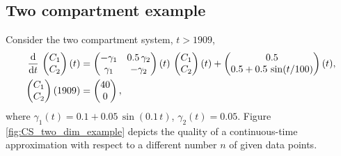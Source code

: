 \documentclass[11pt,a4paper]{article}
\newcommand{\deriv}[1]{\frac{\mathrm{d}}{\mathrm{d}#1}}
\begin{document}
\subsection{Two compartment example}
    Consider the two compartment system, $t>1909$,
    \begin{equation}\label{eqn:CS_two_dim_example}
        \begingroup\makeatletter\def\f@size{10}\check@mathfonts
        \begin{aligned}
            \deriv{t}\,\begin{pmatrix} C_1 \\ C_2 \end{pmatrix}(t) &= 
            \begin{pmatrix} -\gamma_1 & 0.5\,\gamma_2 \\ \gamma_1 & -\gamma_2 \end{pmatrix}(t)\,
            \begin{pmatrix} C_1 \\ C_2 \end{pmatrix}(t) + 
            \begin{pmatrix} 0.5 \\ 0.5 + 0.5\,\sin(t/100) \end{pmatrix}(t),\\
            \begin{pmatrix} C_1 \\ C_2 \end{pmatrix}(1909) &=
            \begin{pmatrix} 40 \\ 0 \end{pmatrix},
        \end{aligned}
        \endgroup
    \end{equation}
    where $\gamma_1(t)=0.1+0.05\,\sin(0.1\,t)$, $\gamma_2(t)=0.05$.
    Figure \ref{fig:CS_two_dim_example} depicts the quality of a continuous-time approximation with respect to a different number $n$ of given data points.
\end{document}
